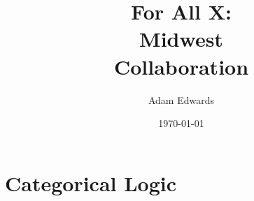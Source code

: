 \documentclass[twoside]{tufte-book}
\title{For All X: \\ Midwest \\ Collaboration}
\author[Adam Edwards]{Adam Edwards}
\date{\today}
\begin{document}

\frontmatter
\pagestyle{empty}



\begin{fullwidth}
    \tableofcontents
\end{fullwidth}




\pagestyle{fancy}

\begin{fullwidth}
    \listoffigures
    \newpage
    \listoftables
\end{fullwidth}

\mainmatter



\part{Categorical Logic}\label{part:cat_logic}
    

\end{document}

